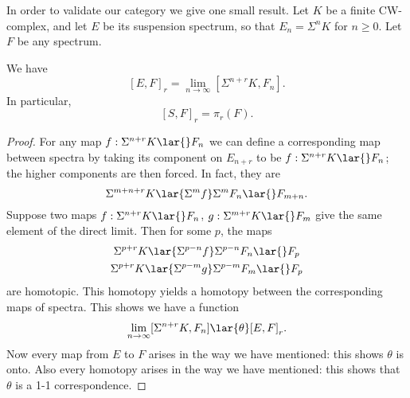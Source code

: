 \documentclass[../main]{subfiles}
\begin{document}
In order to validate our category we give one small result. Let $K$ be a finite CW-complex, and let $E$ be its suspension spectrum, so that $E_n=\Sigma  ^nK$ for $n\geq 0$. Let $F$ be any spectrum.

\begin{proposition}
We have
\[
[E,F]_r = \lim_{n\to\infty} [\Sigma  ^{n+r}K,F_n].
\]
In particular,
\[
[S,F]_r = \pi_r(F).
\]
\end{proposition}
\begin{proof}
For any map $f: \Sigma  ^{n+r}K\lar{} F_n$ we can define a corresponding map between spectra by taking its component on $E_{n+r}$ to be $f: \Sigma^{n+r}K\lar{}F_n$; the higher components are then forced. In fact, they are
\[
\Sigma  ^{m+n+r}K
\lar{\Sigma  ^mf}
\Sigma  ^m F_n
\lar{}
F_{m+n}.
\]
Suppose two maps $f: \Sigma^{n+r}K\lar{}F_n$, $g:\Sigma  ^{m+r}K\lar{}F_m$ give the same element of the direct limit. Then for some $p$, the maps
    \begin{gather*}
    \Sigma  ^{p+r}K
    \lar{\Sigma  ^{p-n}f}
    \Sigma  ^{p-n}F_n
    \lar{}
    F_p
    \\
    \Sigma  ^{p+r}K
    \lar{\Sigma  ^{p-m}g}
    \Sigma  ^{p-m}F_m
    \lar{}
    F_p
    \end{gather*}
are homotopic. This homotopy yields a homotopy between the corresponding maps of spectra. This shows we have a function
\[
\lim_{n\to\infty} [\Sigma  ^{n+r}K,F_n]
\lar{\theta}
[E,F]_r.
\]
Now every map from $E$ to $F$ arises in the way we have mentioned: this shows $\theta$ is onto. Also every homotopy arises in the way we have mentioned: this shows that $\theta$ is a 1-1 correspondence.
\end{proof}
\end{document}
